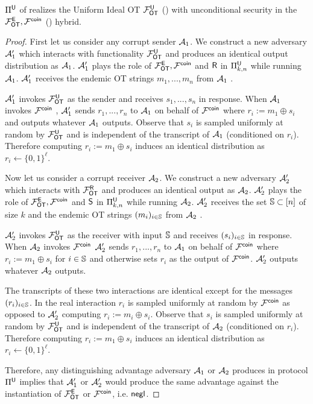 \begin{lemma}\label{lem:EtoU}
	$\Pi^{\mathsf{U}}$ of  realizes the Uniform Ideal OT $\mathcal{F}_{\mathsf{OT}}^{\mathsf{U}}$ () with unconditional security in the $\mathcal{F}_{\mathsf{OT}}^\mathsf{E},\mathcal{F}^{\mathsf{coin}}$ () hybrid.
\end{lemma}
\iffullversion
\begin{proof}
	First let us consider any corrupt sender $\mathcal{A}_1$. We construct a new adversary $\mathcal{A}_1'$ which interacts with functionality $\mathcal{F}_{\mathsf{OT}}^{\mathsf{U}}$ and produces an identical output distribution as $\mathcal{A}_1$.  $\mathcal{A}_1'$ plays the role of $\mathcal{F}_{\mathsf{OT}}^\mathsf{E},\mathcal{F}^{\mathsf{coin}}$ and $\mathsf{R}$ in $\Pi^{\mathsf{U}}_{k,n}$ while running $\mathcal{A}_1$. $\mathcal{A}_1'$ receives the endemic OT strings $m_1,...,m_n$ from $\mathcal{A}_1$%
.
	
	
	$\mathcal{A}_1'$ invokes $\mathcal{F}_{\mathsf{OT}}^{\mathsf{U}}$ as the sender and receives $s_1,...,s_n$ in response. When $\mathcal{A}_1$ invokes $\mathcal{F}^{\mathsf{coin}}$%
, $\mathcal{A}_1'$ sends $r_1,...,r_n$ to $\mathcal{A}_1$ on behalf of $\mathcal{F}^{\mathsf{coin}}$ where $r_i:=m_1\oplus s_i$ and outputs whatever $\mathcal{A}_1$ outputs. Observe that $s_i$ is sampled uniformly at random by $\mathcal{F}_{\mathsf{OT}}^{\mathsf{U}}$ and is independent of the transcript of $\mathcal{A}_1$ (conditioned on $r_i$). Therefore computing $r_i:=m_1\oplus s_i$ induces an identical distribution as $r_i\gets\{0,1\}^\ell$.
	
	Now let us consider a corrupt receiver $\mathcal{A}_2$. We construct a new adversary $\mathcal{A}_2'$ which interacts with $\mathcal{F}_{\mathsf{OT}}^{\mathsf{R}}$ and produces an identical output as $\mathcal{A}_2$. $\mathcal{A}_2'$ plays the role of $\mathcal{F}_{\mathsf{OT}}^\mathsf{E},\mathcal{F}^{\mathsf{coin}}$ and $\mathsf{S}$ in $\Pi^{\mathsf{U}}_{k,n}$ while running $\mathcal{A}_2$. $\mathcal{A}_2'$ receives the set $\mathsf{\mathbb S}\subset[n]$ of size $k$ and the endemic OT strings $(m_i)_{i\in \mathsf{\mathbb S}}$ from $\mathcal{A}_2$%
. 
	
	
	$\mathcal{A}_2'$ invokes  $\mathcal{F}_{\mathsf{OT}}^{\mathsf{U}}$ as the receiver with input $\mathsf{\mathbb S}$ and receives $(s_i)_{i\in\mathsf{\mathbb S}}$ in response. When $\mathcal{A}_2$ invokes $\mathcal{F}^{\mathsf{coin}}$%
	$\mathcal{A}_2'$ sends $r_1,...,r_n$ to $\mathcal{A}_1$ on behalf of $\mathcal{F}^{\mathsf{coin}}$ where $r_i:=m_1\oplus s_i$ for $i\in \mathsf{\mathbb S}$ and otherwise sets $r_i$ as the output of $\mathcal{F}^\mathsf{coin}$. $\mathcal{A}_2'$ outputs whatever $\mathcal{A}_2$ outputs.
	
	The transcripts of these two interactions are identical except for the messages $(r_i)_{i\in \mathsf{\mathbb S}}$. In the real interaction $r_i$ is sampled uniformly at random by $\mathcal{F}^{\mathsf{coin}}$ as opposed to $\mathcal{A}_2'$ computing $r_i:=m_i\oplus s_i$. Observe that $s_i$ is sampled uniformly at random by $\mathcal{F}_{\mathsf{OT}}^{\mathsf{U}}$ and is independent of the transcript of $\mathcal{A}_2$ (conditioned on $r_i$). Therefore computing $r_i:=m_1\oplus s_i$ induces an identical distribution as $r_i\gets\{0,1\}^\ell$.

	Therefore, any distinguishing advantage adversary $\mathcal{A}_1$ or $\mathcal{A}_2$ produces in protocol $\Pi^{\mathsf{U}}$ implies that $\mathcal{A}_1'$ or $\mathcal{A}_2'$ would produce the same advantage against the instantiation of $\mathcal{F}_{\mathsf{OT}}^\mathsf{E}$ or $\mathcal{F}^\mathsf{coin}$, i.e. $\mathsf{negl}$.
	
\end{proof}

